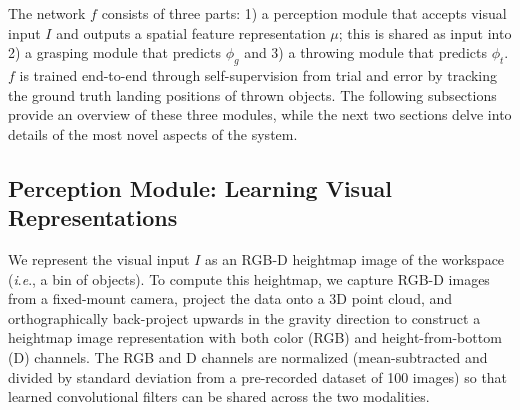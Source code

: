 \documentclass[journal]{IEEEtran}
\newcommand{\ie}{\textit{i}.\textit{e}., }
\begin{document}
The network $f$ consists of three parts: 1) a perception module that accepts visual input $I$ and outputs a spatial feature representation $\mu$; this is shared as input into 2) a grasping module that predicts $\phi_g$ and 3) a throwing module that predicts $\phi_t$. $f$ is trained end-to-end through self-supervision from trial and error by tracking the ground truth landing positions of thrown objects.  The following subsections provide an overview of these three modules, while the next two sections delve into details of the most novel aspects of the system.




\subsection{Perception Module: Learning Visual Representations}
\label{sec:visual-representation}

We represent the visual input $I$ as an RGB-D heightmap image of the workspace (\ie a bin of objects). To compute this heightmap, we capture RGB-D images from a fixed-mount camera, project the data onto a 3D point cloud, and orthographically back-project upwards in the gravity direction to construct a heightmap image representation with both color (RGB) and height-from-bottom (D) channels. The RGB and D channels are normalized (mean-subtracted and divided by standard deviation from a pre-recorded dataset of 100 images) so that learned convolutional filters can be shared across the two modalities. 
\end{document}
